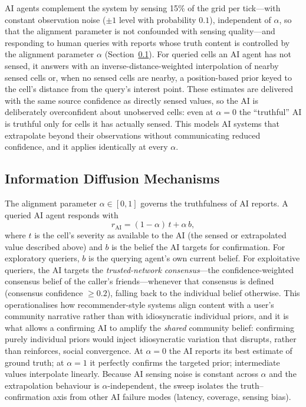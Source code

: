 AI agents complement the system by sensing 15\% of the grid per tick---with
constant observation noise ($\pm1$ level with probability $0.1$), independent of
$\alpha$, so that the alignment parameter is not confounded with sensing
quality---and responding to human queries with reports whose truth content is
controlled by the alignment parameter $\alpha$ (Section~\ref{sec:alignment}).
For queried cells an AI agent has not sensed, it answers with an
inverse-distance-weighted interpolation of nearby sensed cells or, when no sensed
cells are nearby, a position-based prior keyed to the cell's distance from the
query's interest point.
These estimates are delivered with the same source confidence as directly sensed
values, so the AI is deliberately overconfident about unobserved cells: even at
$\alpha=0$ the ``truthful'' AI is truthful only for cells it has actually sensed.
This models AI systems that extrapolate beyond their observations without
communicating reduced confidence, and it applies identically at every $\alpha$.

\subsection{Information Diffusion Mechanisms}
\label{sec:alignment}

The alignment parameter $\alpha\in[0,1]$ governs the truthfulness of AI reports.
A queried AI agent responds with
%
\begin{equation}
  r_{\mathrm{AI}} = (1-\alpha)\,t + \alpha\,b,
  \label{eq:alignment}
\end{equation}
%
where $t$ is the cell's severity as available to the AI (the sensed or
extrapolated value described above) and $b$ is the belief the AI targets for
confirmation.
For exploratory queriers, $b$ is the querying agent's own current belief.
For exploitative queriers, the AI targets the \emph{trusted-network consensus}---the
confidence-weighted consensus belief of the caller's friends---whenever that
consensus is defined (consensus confidence $\geq 0.2$), falling back to the
individual belief otherwise.
This operationalises how recommender-style systems align content with a user's
community narrative rather than with idiosyncratic individual priors, and it is
what allows a confirming AI to amplify the \emph{shared} community belief:
confirming purely individual priors would inject idiosyncratic variation that
disrupts, rather than reinforces, social convergence.
At $\alpha=0$ the AI reports its best estimate of ground truth; at $\alpha=1$ it
perfectly confirms the targeted prior; intermediate values interpolate linearly.
Because AI sensing noise is constant across $\alpha$ and the extrapolation
behaviour is $\alpha$-independent, the sweep isolates the truth--confirmation
axis from other AI failure modes (latency, coverage, sensing bias).

